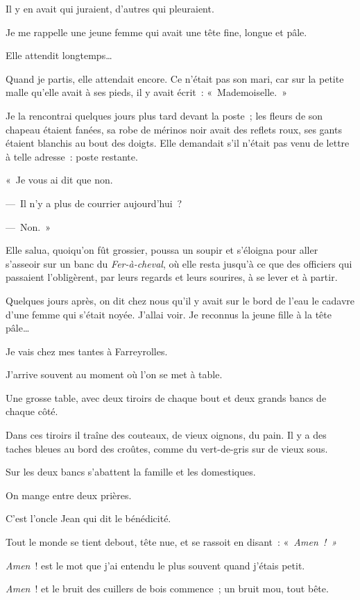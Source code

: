 \documentclass[french,twoside]{book} %
\begin{document}
Il y en avait qui juraient, d’autres qui pleuraient.\par
\bigbreak
\noindent Je me rappelle une jeune femme qui avait une tête fine, longue et pâle.\par
Elle attendit longtemps…\par
Quand je partis, elle attendait encore. Ce n’était pas son mari, car sur la petite malle qu’elle avait à ses pieds, il y avait écrit : « Mademoiselle. »\par
Je la rencontrai quelques jours plus tard devant la poste ; les fleurs de son chapeau étaient fanées, sa robe de mérinos noir avait des reflets roux, ses gants étaient blanchis au bout des doigts. Elle demandait s’il n’était pas venu de lettre à telle adresse : poste restante.\par
« Je vous ai dit que non.\par
— Il n’y a plus de courrier aujourd’hui ?\par
— Non. »\par
Elle salua, quoiqu’on fût grossier, poussa un soupir et s’éloigna pour aller s’asseoir sur un banc du \emph{Fer-à-cheval}, où elle resta jusqu’à ce que des officiers qui passaient l’obligèrent, par leurs regards et leurs sourires, à se lever et à partir.\par
Quelques jours après, on dit chez nous qu’il y avait sur le bord de l’eau le cadavre d’une femme qui s’était noyée. J’allai voir. Je reconnus la jeune fille à la tête pâle…\par
\bigbreak
\noindent Je vais chez mes tantes à Farreyrolles.\par
J’arrive souvent au moment où l’on se met à table.\par
Une grosse table, avec deux tiroirs de chaque bout et deux grands bancs de chaque côté.\par
Dans ces tiroirs il traîne des couteaux, de vieux oignons, du pain. Il y a des taches bleues au bord des croûtes, comme du vert-de-gris sur de vieux sous.\par
Sur les deux bancs s’abattent la famille et les domestiques.\par
On mange entre deux prières.\par
C’est l’oncle Jean qui dit le bénédicité.\par
Tout le monde se tient debout, tête nue, et se rassoit en disant : « \emph{Amen ! »}\par
\emph{Amen} ! est le mot que j’ai entendu le plus souvent quand j’étais petit.\par
\emph{Amen} ! et le bruit des cuillers de bois commence ; un bruit mou, tout bête.\par
\end{document}
